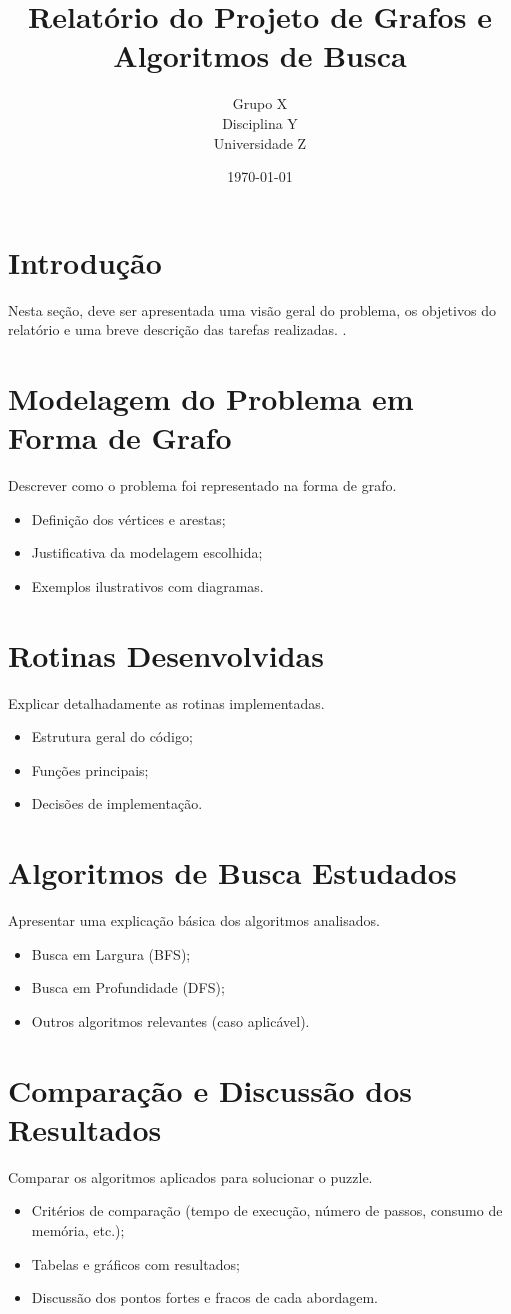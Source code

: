 \documentclass[12pt,a4paper]{article}
\title{Relatório do Projeto de Grafos e Algoritmos de Busca}
\author{Grupo X \\ Disciplina Y \\ Universidade Z}
\date{\today}
\begin{document}
\maketitle
\tableofcontents
\newpage

\section{Introdução}
Nesta seção, deve ser apresentada uma visão geral do problema, os objetivos do relatório e uma breve descrição das tarefas realizadas. 
\cite{cormen}.

\section{Modelagem do Problema em Forma de Grafo}
Descrever como o problema foi representado na forma de grafo.
\begin{itemize}
\item Definição dos vértices e arestas;
\item Justificativa da modelagem escolhida;
\item Exemplos ilustrativos com diagramas.
\end{itemize}

\section{Rotinas Desenvolvidas}
Explicar detalhadamente as rotinas implementadas.
\begin{itemize}
\item Estrutura geral do código;
\item Funções principais;
\item Decisões de implementação.
\end{itemize}

\section{Algoritmos de Busca Estudados}
Apresentar uma explicação básica dos algoritmos analisados.
\begin{itemize}
\item Busca em Largura (BFS);
\item Busca em Profundidade (DFS);
\item Outros algoritmos relevantes (caso aplicável).
\end{itemize}

\section{Comparação e Discussão dos Resultados}
Comparar os algoritmos aplicados para solucionar o puzzle.
\begin{itemize}
\item Critérios de comparação (tempo de execução, número de passos, consumo de memória, etc.);
\item Tabelas e gráficos com resultados;
\item Discussão dos pontos fortes e fracos de cada abordagem.
\end{itemize}
\end{document}
